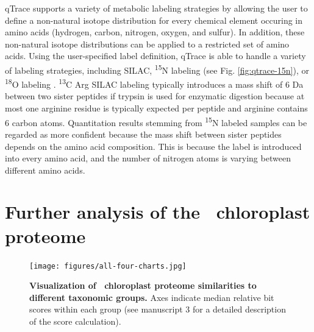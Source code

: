 qTrace supports a variety of metabolic labeling strategies by allowing the 
user to define a non-natural isotope distribution for every chemical element 
occuring in amino acids (hydrogen, carbon, nitrogen, oxygen, and sulfur).
In addition, these non-natural isotope distributions can be applied 
to a restricted set of amino acids.
Using the user-specified label definition, qTrace is able to handle a variety
of labeling strategies, including SILAC, \textsuperscript{15}N labeling (see 
Fig. \ref{fig:qtrace-15n}), or \textsuperscript{18}O labeling 
\citep{Miyagi2007}.
\textsuperscript{13}C Arg SILAC labeling typically introduces a mass shift
of 6 Da between two sister peptides if trypsin is used for enzymatic digestion
because at most one arginine residue is typically expected per peptide and
arginine contains 6 carbon atoms.
Quantitation results stemming from \textsuperscript{15}N labeled samples
can be regarded as more confident because the mass shift between sister peptides
depends on the amino acid composition.
This is because the label is introduced into every amino acid, and the number of
nitrogen atoms is varying between different amino acids.

% 

\section{Further analysis of the \cre~chloroplast proteome}

\begin{figure}
\texttt{[image: figures/all-four-charts.jpg]}
\caption{
    {\bf Visualization of \cre~chloroplast proteome similarities to
    different taxonomic groups.}
    Axes indicate median relative bit scores within each group (see
    manuscript 3 for a detailed description of the score calculation).
}
\label{fig:mia-review-isolines}
\end{figure}

